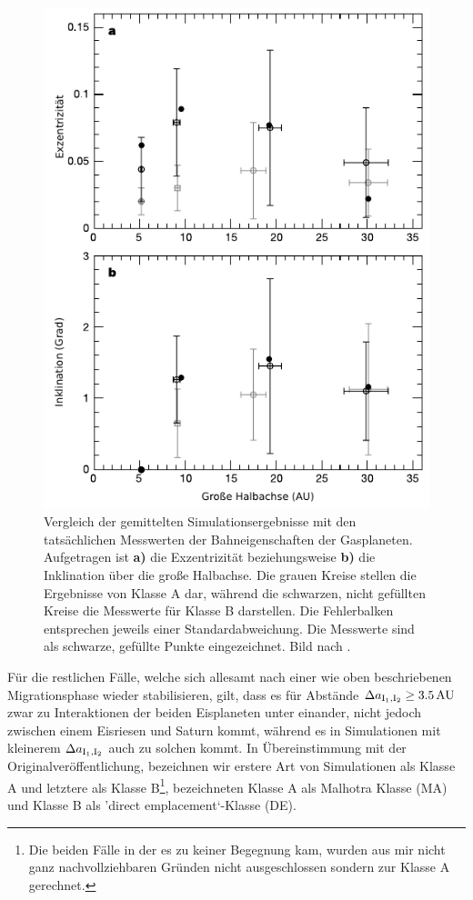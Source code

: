 \documentclass[12pt,a4paper,twoside]{article}
\renewcommand{\cite}{\citep}
\begin{document}
\begin{figure}[tbn]
\centering
\includegraphics[scale=1]{img/Tsiganis2005-2.pdf}
\caption{Vergleich der gemittelten Simulationsergebnisse mit den tatsächlichen Messwerten der Bahneigenschaften der Gasplaneten. Aufgetragen ist \textbf{a)} die Exzentrizität beziehungsweise \textbf{b)} die Inklination über die große Halbachse. Die grauen Kreise stellen die Ergebnisse von Klasse A dar, während die schwarzen, nicht gefüllten Kreise die Messwerte für Klasse B darstellen. Die Fehlerbalken entsprechen jeweils einer Standardabweichung. Die Messwerte sind als schwarze, gefüllte Punkte eingezeichnet. Bild nach \cite{Tsiganis2005}.}
\label{fig:VergleichmitMesswerten}
\end{figure}
Für die restlichen Fälle, welche sich allesamt nach einer wie oben beschriebenen Migrationsphase wieder stabilisieren, gilt, dass es für Abstände $\DII \ge \unit[3.5]{AU}$ zwar zu Interaktionen der beiden Eisplaneten unter einander, nicht jedoch zwischen einem Eisriesen und Saturn kommt, während es in Simulationen mit kleinerem $\Delta a_{\mathrm{I}_1,\mathrm{I}_2}$ auch zu solchen kommt. In Übereinstimmung mit der Originalveröffentlichung, bezeichnen wir erstere Art von Simulationen als Klasse A und letztere als Klasse B\footnote{Die beiden Fälle in der es zu keiner Begegnung kam, wurden aus mir nicht ganz nachvollziehbaren Gründen nicht ausgeschlossen sondern zur Klasse A gerechnet.}, \cite{Nesvorny2007} bezeichneten Klasse A als Malhotra Klasse (MA) \citep[nach][]{Malhotra1996,Hahn1999a} und Klasse B als 'direct emplacement`-Klasse (DE).
\end{document}
